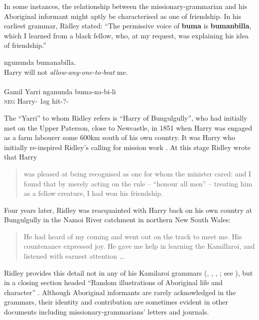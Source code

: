 In some instances, the relationship between the missionary-grammarian and his Aboriginal informant might aptly be characterised as one of friendship. In his earliest grammar, Ridley \citeyearpar[76]{ridley_kamilaroi_1855-1} stated: “The permissive voice of \textbf{buma} is \textbf{bumanbilla}, which I learned from a black fellow, who, at my request, was explaining his idea of friendship.'' 

\ea\label{ex:1:1}
 {ngununda bumanabilla.} \\
Harry {will not \textit{allow-any-one-to-beat} me.} \\
\glt \citep[76]{ridley_kamilaroi_1855-1}\\
\gll Gamil Yarri nganunda buma-na-bi-li\\
\textsc{neg} Harry-\stockcaps{[ERG]} 1sg hit-?-\footnotemark{}\\
\z{}

The “Yarri” to whom Ridley refers is “Harry of Bungulgully”, who \citet[170]{ridley_kamilaroi_1875} had initially met on the Upper Paterson, close to Newcastle, in 1851 when Harry was engaged as a farm labourer some 600km south of his own country. It was Harry who initially re-inspired Ridley’s calling for mission work \citep{gunson_australian_2016-1}. At this stage Ridley wrote that Harry 
\begin{quote}
    was pleased at being recognised as one for whom the minister cared: and I found that by merely acting on the rule – “honour all men” – treating him as a fellow creature, I had won his friendship.
\end{quote}

Four years later, Ridley was reacquainted with Harry back on his own country at Bungulgully in the Namoi River catchment in northern New South Wales:
\begin{quote}
    He had heard of my coming and went out on the track to meet me. His countenance expressed joy. He gave me help in learning the Kamillaroi, and listened with earnest attention …
\end{quote}

Ridley provides this detail not in any of his Kamilaroi grammars (\citeyear{ridley_kamilaroi_1855-1}, \citeyear{ridley_gurre_1856}, \citeyear{ridley_kamilaroi_1866}, \citeyear{ridley_kamilaroi_1875}; see ), but in a closing section headed “Random illustrations of Aboriginal life and character” \citeyearpar[166--170]{ridley_kamilaroi_1875}. Although Aboriginal informants are rarely acknowledged in the grammars, their identity and contribution are sometimes evident in other documents including missionary-grammarians’ letters and journals. 

